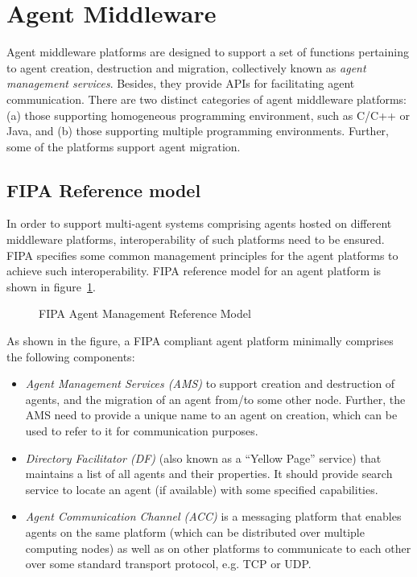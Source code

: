 \section{Agent Middleware}

Agent middleware platforms are designed to support a set of functions pertaining to agent creation, destruction and migration,
collectively known as {\it agent management services}. Besides, they provide APIs for facilitating agent communication. There
are two distinct categories of agent middleware platforms: (a) those supporting homogeneous programming environment, such as
C/C++ or Java, and (b) those supporting multiple programming environments. Further, some of the platforms support 
agent migration. 

\subsection{FIPA Reference model}

In order to support multi-agent systems comprising agents hosted on different middleware platforms, interoperability of such
platforms need to be ensured. FIPA specifies some common management principles for the agent platforms to achieve such 
interoperability. FIPA reference model for an agent platform is shown in figure~\ref{fig:agents:ams}.

\begin{figure}[!htbp]
	\centering
	\caption{FIPA Agent Management Reference Model}
	\label{fig:agents:ams}
\end{figure}

\noindent
As shown in the figure, a FIPA compliant agent platform minimally comprises the following components:
   
\begin{itemize}
	\item {\em Agent Management Services (AMS)} to support creation and destruction of agents, and the migration of an agent 
		from/to some other node. Further, the AMS need to provide a unique name to an agent on creation, which can be 
		used to refer to it for communication purposes.
	\item {\em Directory Facilitator (DF)} (also known
		as a ``Yellow Page'' service) that maintains a list of all agents and their properties. It should provide search
		service to locate an agent (if available) with some specified capabilities.
	\item {\em Agent Communication Channel (ACC)} is a messaging platform that enables agents on the same platform (which can
		be distributed over multiple computing nodes) as well as on other platforms to communicate to each other over some 
		standard transport protocol, e.g. TCP or UDP.
\end{itemize}

